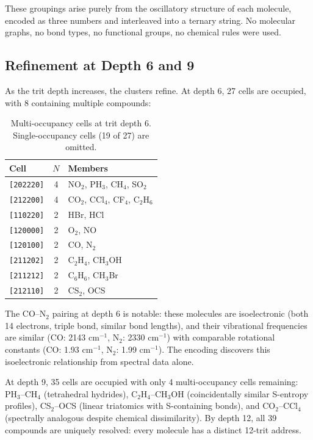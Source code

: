 \documentclass[11pt,a4paper]{article}
\theoremstyle{definition}
\theoremstyle{remark}
\begin{document}
These groupings arise purely from the oscillatory structure of each molecule, encoded as three numbers and interleaved into a ternary string. No molecular graphs, no bond types, no functional groups, no chemical rules were used.

\subsection{Refinement at Depth 6 and 9}

As the trit depth increases, the clusters refine. At depth 6, 27 cells are occupied, with 8 containing multiple compounds:

\begin{table}[H]
\centering
\caption{Multi-occupancy cells at trit depth 6. Single-occupancy cells (19 of 27) are omitted.}
\label{tab:depth6}
\begin{tabular}{lcp{8cm}}
\toprule
Cell & $N$ & Members \\
\midrule
\texttt{[202220]} & 4 & NO$_2$, PH$_3$, CH$_4$, SO$_2$ \\
\texttt{[212200]} & 4 & CO$_2$, CCl$_4$, CF$_4$, C$_2$H$_6$ \\
\texttt{[110220]} & 2 & HBr, HCl \\
\texttt{[120000]} & 2 & O$_2$, NO \\
\texttt{[120100]} & 2 & CO, N$_2$ \\
\texttt{[211202]} & 2 & C$_2$H$_4$, CH$_3$OH \\
\texttt{[211212]} & 2 & C$_6$H$_6$, CH$_3$Br \\
\texttt{[212110]} & 2 & CS$_2$, OCS \\
\bottomrule
\end{tabular}
\end{table}

The CO--N$_2$ pairing at depth 6 is notable: these molecules are isoelectronic (both 14 electrons, triple bond, similar bond lengths), and their vibrational frequencies are similar (CO: 2143 cm$^{-1}$, N$_2$: 2330 cm$^{-1}$) with comparable rotational constants (CO: 1.93 cm$^{-1}$, N$_2$: 1.99 cm$^{-1}$). The encoding discovers this isoelectronic relationship from spectral data alone.

At depth 9, 35 cells are occupied with only 4 multi-occupancy cells remaining: PH$_3$--CH$_4$ (tetrahedral hydrides), C$_2$H$_4$--CH$_3$OH (coincidentally similar S-entropy profiles), CS$_2$--OCS (linear triatomics with S-containing bonds), and CO$_2$--CCl$_4$ (spectrally analogous despite chemical dissimilarity). By depth 12, all 39 compounds are uniquely resolved: every molecule has a distinct 12-trit address.
\end{document}
